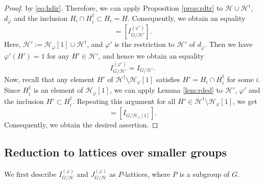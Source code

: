 \documentclass[12pt]{amsart}
\theoremstyle{plain}
\theoremstyle{definition}
\numberwithin{thm}{section}
\numberwithin{equation}{section}
\newcommand{\cH}{\mathcal{H}}
\begin{document}
\begin{proof}
by \eqref{eq:hdir}. Therefore, we can apply Proposition \ref{prop:rdtr} to $\cH\cup \cH^{\dagger}$, $d_{\widetilde{\varphi}}$ and the inclusion $H_{i}\cap H_{i}^{\dagger}\subset H_{i}=H$. Consequently, we obtain an equality
\begin{equation*}
    [I_{G/(\cH \cup \cH^{\dagger})}^{(d_{\widetilde{\varphi}})}]=[I_{G/\cH'}^{(\varphi')}]. 
\end{equation*}
Here, $\cH':=\cH_{\varphi}[1]\cup \cH^{\dagger}$, and $\varphi'$ is the restriction to $\cH'$ of $d_{\widetilde{\varphi}}$. Then we have $\varphi'(H')=1$ for any $H'\in \cH'$, and hence we obtain an equality
\begin{equation*}
    I_{G/\cH'}^{(\varphi')}=I_{G/\cH'}. 
\end{equation*}
Now, recall that any element $H'$ of $\cH^{\dagger}\setminus \cH_{\varphi}[1]$ satisfies $H'=H_{i}\cap H_{i}^{\dagger}$ for some $i$. Since $H_{i}^{\dagger}$ is an element of $\cH_{\varphi}[1]$, we can apply Lemma \ref{lem:rded} to $\cH'$, $\varphi'$ and the inclusion $H'\subset H_{i}^{\dagger}$. Repeating this argument for all $H'\in \cH^{\dagger}\setminus \cH_{\varphi}[1]$, we get
\begin{equation*}
    [I_{G/\cH'}]=[I_{G/\cH_{\varphi}[1]}]. 
\end{equation*}
Consequently, we obtain the desired assertion. 
\end{proof}

\subsection{Reduction to lattices over smaller groups}

We first describe $I_{G/\cH}^{(\varphi)}$ and $J_{G/\cH}^{(\varphi)}$ as $P$-lattices, where $P$ is a subgroup of $G$. 
\end{document}
